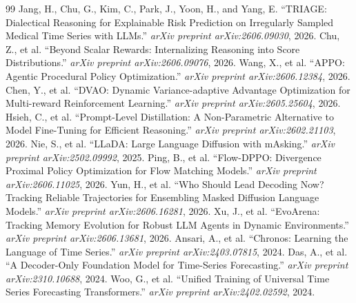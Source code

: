 \documentclass[11pt,a4paper]{article}
\begin{document}
\begin{thebibliography}{99}
 Jang, H., Chu, G., Kim, C., Park, J., Yoon, H., and Yang, E. ``TRIAGE: Dialectical Reasoning for Explainable Risk Prediction on Irregularly Sampled Medical Time Series with LLMs.'' \emph{arXiv preprint arXiv:2606.09030}, 2026.
 Chu, Z., et al. ``Beyond Scalar Rewards: Internalizing Reasoning into Score Distributions.'' \emph{arXiv preprint arXiv:2606.09076}, 2026.
 Wang, X., et al. ``APPO: Agentic Procedural Policy Optimization.'' \emph{arXiv preprint arXiv:2606.12384}, 2026.
 Chen, Y., et al. ``DVAO: Dynamic Variance-adaptive Advantage Optimization for Multi-reward Reinforcement Learning.'' \emph{arXiv preprint arXiv:2605.25604}, 2026.
 Hsieh, C., et al. ``Prompt-Level Distillation: A Non-Parametric Alternative to Model Fine-Tuning for Efficient Reasoning.'' \emph{arXiv preprint arXiv:2602.21103}, 2026.
 Nie, S., et al. ``LLaDA: Large Language Diffusion with mAsking.'' \emph{arXiv preprint arXiv:2502.09992}, 2025.
 Ping, B., et al. ``Flow-DPPO: Divergence Proximal Policy Optimization for Flow Matching Models.'' \emph{arXiv preprint arXiv:2606.11025}, 2026.
 Yun, H., et al. ``Who Should Lead Decoding Now? Tracking Reliable Trajectories for Ensembling Masked Diffusion Language Models.'' \emph{arXiv preprint arXiv:2606.16281}, 2026.
 Xu, J., et al. ``EvoArena: Tracking Memory Evolution for Robust LLM Agents in Dynamic Environments.'' \emph{arXiv preprint arXiv:2606.13681}, 2026.
 Ansari, A., et al. ``Chronos: Learning the Language of Time Series.'' \emph{arXiv preprint arXiv:2403.07815}, 2024.
 Das, A., et al. ``A Decoder-Only Foundation Model for Time-Series Forecasting.'' \emph{arXiv preprint arXiv:2310.10688}, 2024.
 Woo, G., et al. ``Unified Training of Universal Time Series Forecasting Transformers.'' \emph{arXiv preprint arXiv:2402.02592}, 2024.
\end{thebibliography}
\end{document}
